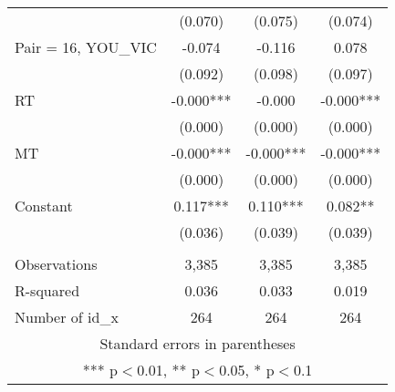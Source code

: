 \documentclass[]{article}
\begin{document}
\begin{tabular}{lccc}
 & (0.070) & (0.075) & (0.074) \\
Pair = 16, YOU\_VIC & -0.074 & -0.116 & 0.078 \\
 & (0.092) & (0.098) & (0.097) \\
RT & -0.000*** & -0.000 & -0.000*** \\
 & (0.000) & (0.000) & (0.000) \\
MT & -0.000*** & -0.000*** & -0.000*** \\
 & (0.000) & (0.000) & (0.000) \\
Constant & 0.117*** & 0.110*** & 0.082** \\
 & (0.036) & (0.039) & (0.039) \\
 &  &  &  \\
Observations & 3,385 & 3,385 & 3,385 \\
R-squared & 0.036 & 0.033 & 0.019 \\
 Number of id\_x & 264 & 264 & 264 \\ \hline
\multicolumn{4}{c}{ Standard errors in parentheses} \\
\multicolumn{4}{c}{ *** p$<$0.01, ** p$<$0.05, * p$<$0.1} \\
\end{tabular}
\end{document}
